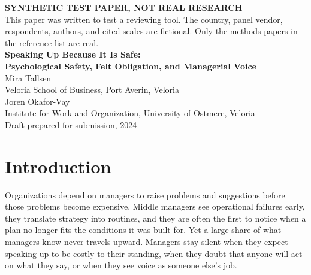 \documentclass[12pt]{article}
\begin{document}
\thispagestyle{empty}
\begin{center}
\vspace*{0.5in}
{\large\textbf{SYNTHETIC TEST PAPER, NOT REAL RESEARCH}}\\[0.3in]
{\small This paper was written to test a reviewing tool. The country, panel vendor, respondents, authors, and cited scales are fictional. Only the methods papers in the reference list are real.}\\[0.8in]
{\LARGE\textbf{Speaking Up Because It Is Safe:\\[0.1in] Psychological Safety, Felt Obligation, and Managerial Voice}}\\[0.6in]
{\large Mira Tallsen}\\
Veloria School of Business, Port Averin, Veloria\\[0.2in]
{\large Joren Okafor-Vay}\\
Institute for Work and Organization, University of Ostmere, Veloria\\[0.8in]
Draft prepared for submission, 2024
\end{center}
\clearpage\setcounter{page}{2}

\begin{abstract}
\noindent Managers often hold information that senior leaders need but do not hear. We argue that psychological safety increases voice because managers who feel safe come to feel obligated to improve their unit. Using a questionnaire completed by 402 managers from an online panel in Veloria, we fit a path model to the correlations among psychological safety, felt obligation, voice, and two controls. Psychological safety increases voice both directly and through felt obligation, and the indirect path is significant. The findings identify felt obligation as the mechanism that links a safe climate to speaking up and show that organizations can raise managerial voice by investing in psychological safety.

\medskip
\noindent\textit{Keywords:} psychological safety; voice; felt obligation; middle managers; path model
\end{abstract}

\section{Introduction}

Organizations depend on managers to raise problems and suggestions before those problems become expensive. Middle managers see operational failures early, they translate strategy into routines, and they are often the first to notice when a plan no longer fits the conditions it was built for. Yet a large share of what managers know never travels upward. Managers stay silent when they expect speaking up to be costly to their standing, when they doubt that anyone will act on what they say, or when they see voice as someone else's job.
\end{document}
